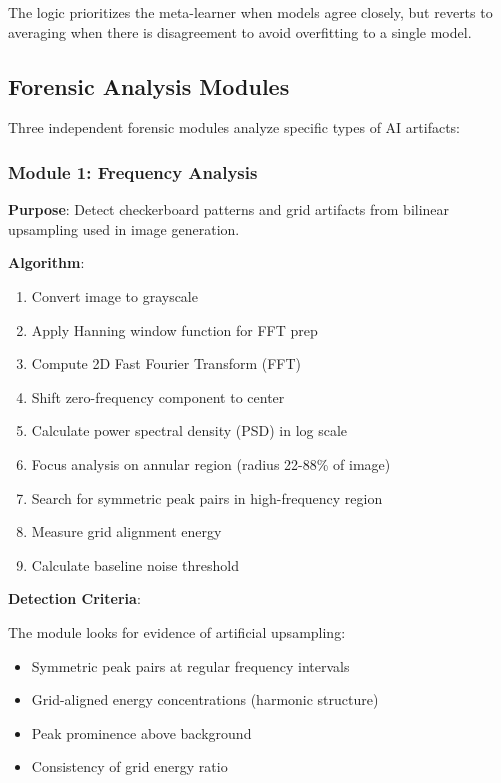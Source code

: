 \documentclass[12pt,a4paper]{book}
\begin{document}
The logic prioritizes the meta-learner when models agree closely, but reverts to averaging when there is disagreement to avoid overfitting to a single model.

\subsection{Forensic Analysis Modules}
\label{subsec:forensics}

Three independent forensic modules analyze specific types of AI artifacts:

\subsubsection{Module 1: Frequency Analysis}

\textbf{Purpose}: Detect checkerboard patterns and grid artifacts from bilinear upsampling used in image generation.

\textbf{Algorithm}:

\begin{enumerate}
    \item Convert image to grayscale
    \item Apply Hanning window function for FFT prep
    \item Compute 2D Fast Fourier Transform (FFT)
    \item Shift zero-frequency component to center
    \item Calculate power spectral density (PSD) in log scale
    \item Focus analysis on annular region (radius 22-88\% of image)
    \item Search for symmetric peak pairs in high-frequency region
    \item Measure grid alignment energy
    \item Calculate baseline noise threshold
\end{enumerate}

\textbf{Detection Criteria}:

The module looks for evidence of artificial upsampling:

\begin{itemize}
    \item Symmetric peak pairs at regular frequency intervals
    \item Grid-aligned energy concentrations (harmonic structure)
    \item Peak prominence above background
    \item Consistency of grid energy ratio
\end{itemize}
\end{document}

